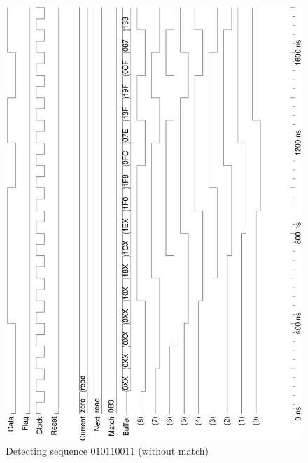\documentclass[10pt,a4paper]{report}
\begin{document}
\begin{figure} \center

\includegraphics[scale=0.49,angle=-90]{graphs/seq_test2.UNMATCHED.ps}
\caption{\small{Detecting sequence $010110011$ (without match)}} \label{wave:usd:t2w1}


\end{figure}
\end{document}
